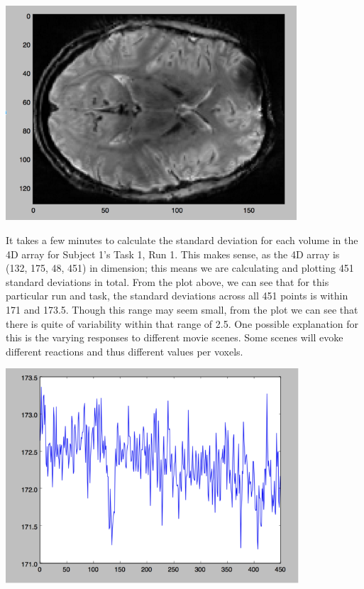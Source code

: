 \documentclass[11pt]{article}
\begin{document}
\begin{center}
\includegraphics[height=8cm]{7}
\end{center}

It takes a few minutes to calculate the standard deviation for each volume in
the 4D array for Subject 1's Task 1, Run 1. This makes sense, as the 4D
array is (132, 175, 48, 451) in dimension; this means we are calculating and
plotting 451 standard deviations in total. From the plot above, we can see
that for this particular run and task, the standard deviations across all 451
points is within 171 and 173.5. Though this range may seem small, from the
plot we can see that there is quite of variability within that range of 2.5.
One possible explanation for this is the varying responses to different movie
scenes. Some scenes will evoke different reactions and thus different values
per voxels.

\begin{center}
\includegraphics[height=8cm]{8}
\end{center}
\end{document}
